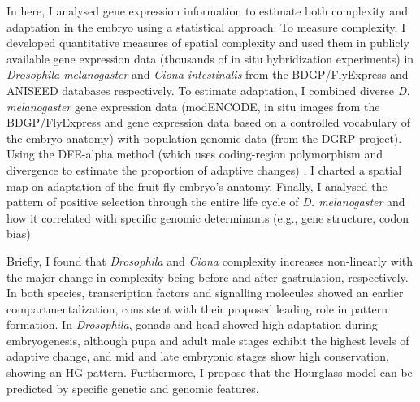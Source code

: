 \hfill\break 
In here, I analysed gene expression information to estimate both complexity and adaptation in the embryo using a statistical approach.
%
To measure complexity, I developed quantitative measures of spatial complexity and used them in publicly available gene expression data (thousands of in situ hybridization experiments) %
 in \textit{Drosophila melanogaster} and \textit{Ciona intestinalis} from the BDGP/FlyExpress and ANISEED databases respectively.
%
To estimate adaptation, I combined diverse \textit{D. melanogaster} gene expression data (modENCODE, in situ images from the BDGP/FlyExpress and gene expression data based on a controlled vocabulary of the embryo anatomy) with population genomic data (from the DGRP project). Using the DFE-alpha method 
(which uses coding-region polymorphism and divergence to estimate the proportion of adaptive changes)
, I charted a spatial map on adaptation of the fruit fly embryo's anatomy. 
Finally, I analysed the pattern of positive selection through the entire life cycle of \textit{D. melanogaster} and how it correlated with specific genomic determinants (e.g., gene structure, codon bias)

\hfill\break 
Briefly, I found that \textit{Drosophila} and \textit{Ciona} complexity increases non-linearly with the major change in complexity being before and after gastrulation, respectively. 
In both species, transcription factors and signalling molecules showed an earlier compartmentalization, consistent with their proposed leading role in pattern formation.
%
In \textit{Drosophila}, gonads and head showed high adaptation during embryogenesis, although pupa and adult male stages exhibit the highest levels of adaptive change, and mid and late embryonic stages show high conservation, showing an HG pattern.
Furthermore, I propose that the Hourglass model can be predicted by specific genetic and genomic features.